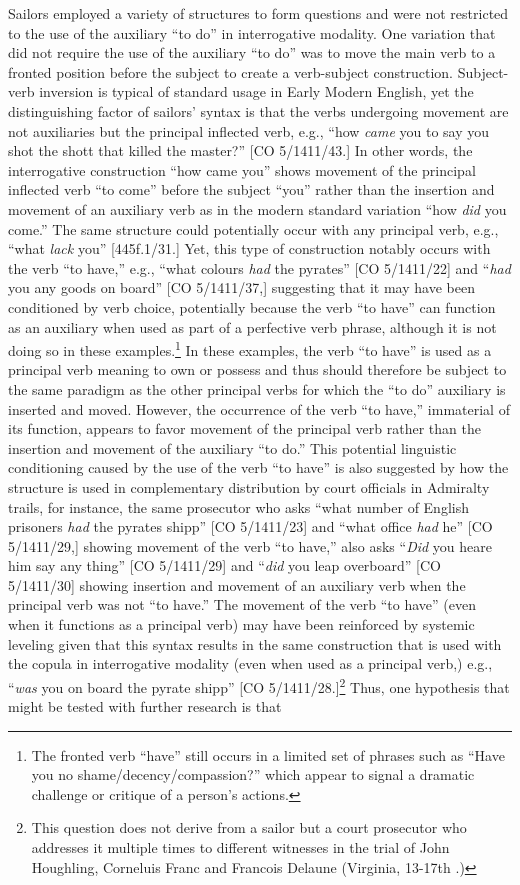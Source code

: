 Sailors employed a variety of structures to form questions and were not restricted to the use of the auxiliary “to do” in interrogative modality. One variation that did not require the use of the auxiliary “to do” was to move the main verb to a fronted position before the subject to create a verb-subject construction. Subject-verb inversion is typical of standard usage in Early Modern English, yet the distinguishing factor of sailors’ syntax is that the verbs undergoing movement are not auxiliaries but the principal inflected verb, e.g., “how \textit{came} you to say you shot the shott that killed the master?” [CO 5/1411/43.] In other words, the interrogative construction “how came you” shows movement of the principal inflected verb “to come” before the subject “you” rather than the insertion and movement of an auxiliary verb as in the modern standard variation “how \textit{did} you come.” The same structure could potentially occur with any principal verb, e.g., “what \textit{lack} you” [445f.1/31.] Yet, this type of construction notably occurs with the verb “to have,” e.g., “what colours \textit{had} the pyrates” [CO 5/1411/22] and “\textit{had} you any goods on board” [CO 5/1411/37,] suggesting that it may have been conditioned by verb choice, potentially because the verb “to have” can function as an auxiliary when used as part of a perfective verb phrase, although it is not doing so in these examples.\footnote{The fronted verb “have” still occurs in a limited set of phrases such as “Have you no shame/decency/compassion?” which appear to signal a dramatic challenge or critique of a person’s actions.} In these examples, the verb “to have” is used as a principal verb meaning to own or possess and thus should therefore be subject to the same paradigm as the other principal verbs for which the “to do” auxiliary is inserted and moved. However, the occurrence of the verb “to have,” immaterial of its function, appears to favor movement of the principal verb rather than the insertion and movement of the auxiliary “to do.” This potential linguistic conditioning caused by the use of the verb “to have” is also suggested by how the structure is used in complementary distribution by court officials in Admiralty trails, for instance, the same prosecutor who asks “what number of English prisoners \textit{had} the pyrates shipp” [CO 5/1411/23] and “what office \textit{had} he” [CO 5/1411/29,] showing movement of the verb “to have,” also asks “\textit{Did} you heare him say any thing” [CO 5/1411/29] and “\textit{did} you leap overboard” [CO 5/1411/30] showing insertion and movement of an auxiliary verb when the principal verb was not “to have.” The movement of the verb “to have” (even when it functions as a principal verb) may have been reinforced by systemic leveling given that this syntax results in the same construction that is used with the copula in interrogative modality (even when used as a principal verb,) e.g., “\textit{was} you on board the pyrate shipp” [CO 5/1411/28.]\footnote{This question does not derive from a sailor but a court prosecutor who addresses it multiple times to different witnesses in the trial of John Houghling, Corneluis Franc and Francois Delaune (Virginia, 13-17th \citealt{May1700}.)} Thus, one hypothesis that might be tested with further research is that 